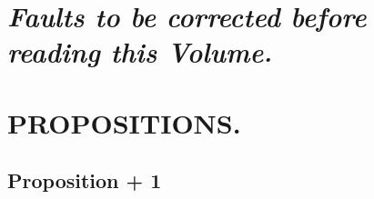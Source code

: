		\newpage
		{\centering\section[CORRIGENDA.]{\textit{Faults to be corrected before reading this Volume.}}
		\label{section\thesection}}
		\clearpage
        \setcounter{page}{1}
		{\centering\section{PROPOSITIONS.}
		\label{section\thesection}}

  	\subsection{Proposition \the\numexpr \theprop + 1}
  	
  	\clearpage
